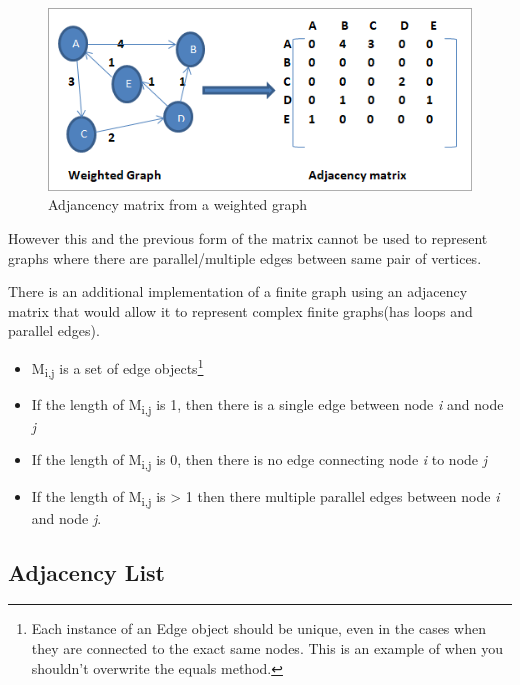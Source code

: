 \documentclass[
]{book}
\providecommand{\tightlist}{%
  \setlength{\itemsep}{0pt}\setlength{\parskip}{0pt}}
\begin{document}
\begin{figure}

{\centering \includegraphics{img/01-image03} 

}

\caption{Adjancency matrix from a weighted graph}\label{fig:wadj-matrix}
\end{figure}

However this and the previous form of the matrix cannot be used to represent graphs where there are parallel/multiple edges between same pair of vertices.

There is an additional implementation of a finite graph using an adjacency matrix that would allow it to represent complex finite graphs(has loops and parallel edges).

\begin{itemize}
\tightlist
\item
  M\textsubscript{i,j} is a set of edge objects\footnote{Each instance of an Edge object should be unique, even in the cases when they are connected to the exact same nodes. This is an example of when you shouldn't overwrite the equals method.}
\item
  If the length of M\textsubscript{i,j} is 1, then there is a single edge between node \emph{i} and node \emph{j}
\item
  If the length of M\textsubscript{i,j} is 0, then there is no edge connecting node \emph{i} to node \emph{j}
\item
  If the length of M\textsubscript{i,j} is \textgreater{} 1 then there multiple parallel edges between node \emph{i} and node \emph{j}.
\end{itemize}

\hypertarget{adjacency-list}{%
\subsection{Adjacency List}\label{adjacency-list}}
\end{document}
